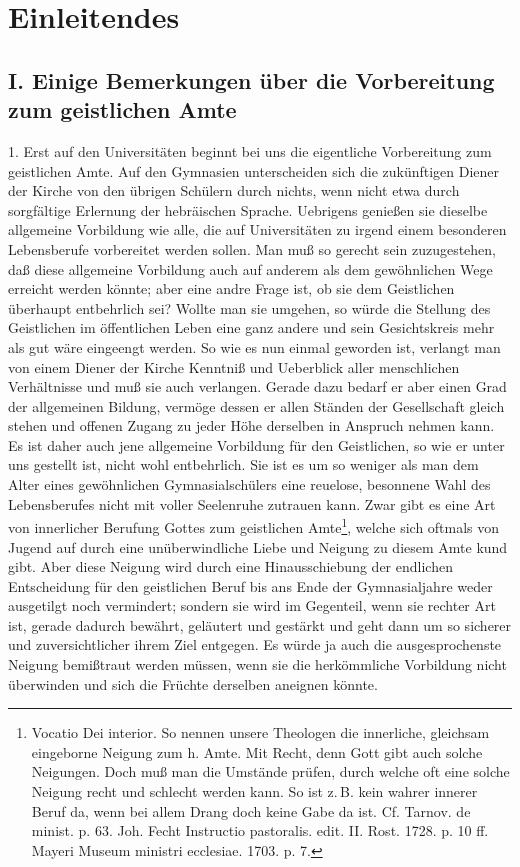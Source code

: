 
\chapter{Einleitendes}

\section[I. Vorbereitung zum geistlichen Amte]{I. Einige Bemerkungen über die Vorbereitung zum geistlichen Amte}

1. Erst auf den Universitäten beginnt bei uns die eigentliche Vorbereitung zum geistlichen Amte. Auf den Gymnasien unterscheiden sich die zukünftigen Diener der Kirche von den übrigen Schülern durch nichts, wenn nicht etwa durch sorgfältige Erlernung der hebräischen Sprache. Uebrigens genießen sie dieselbe allgemeine Vorbildung wie alle, die auf Universitäten zu irgend einem besonderen Lebensberufe vorbereitet werden sollen. Man muß so gerecht sein zuzugestehen, daß diese allgemeine Vorbildung auch auf anderem als dem gewöhnlichen Wege erreicht werden könnte; aber eine andre Frage ist, ob sie dem Geistlichen überhaupt entbehrlich sei? Wollte man sie umgehen, so würde die Stellung des Geistlichen im öffentlichen Leben eine ganz andere und sein Gesichtskreis mehr als gut wäre eingeengt werden. So wie es nun einmal geworden ist, verlangt man von einem Diener der Kirche Kenntniß und Ueberblick aller menschlichen Verhältnisse und muß sie auch verlangen. Gerade dazu bedarf er aber einen Grad der allgemeinen Bildung, vermöge dessen er allen Ständen der Gesellschaft
gleich stehen und offenen Zugang zu jeder Höhe derselben in Anspruch nehmen kann. Es ist daher auch jene allgemeine Vorbildung für den Geistlichen, so wie er unter uns gestellt ist, nicht wohl entbehrlich. Sie ist es um so weniger als man dem Alter eines gewöhnlichen Gymnasialschülers eine reuelose, besonnene Wahl des Lebensberufes nicht mit voller Seelenruhe zutrauen kann. Zwar gibt es eine Art von innerlicher Berufung Gottes zum geistlichen Amte\footnote{Vocatio Dei interior. So nennen unsere Theologen die innerliche, gleichsam eingeborne Neigung zum h. Amte. Mit Recht, denn Gott gibt auch solche Neigungen. Doch muß man die Umstände prüfen, durch welche oft eine solche Neigung recht und schlecht werden kann. So ist z.\,B. kein wahrer innerer Beruf da, wenn bei allem Drang doch keine Gabe da ist. Cf. Tarnov. de minist. p. 63. Joh. Fecht Instructio pastoralis. edit. II. Rost. 1728. p. 10 ff. Mayeri Museum ministri ecclesiae. 1703. p. 7.}, welche sich oftmals von Jugend auf durch eine unüberwindliche Liebe und Neigung zu diesem Amte kund gibt. Aber diese Neigung wird durch eine Hinausschiebung der endlichen Entscheidung für den geistlichen Beruf bis ans Ende der Gymnasialjahre weder ausgetilgt noch vermindert; sondern sie wird im Gegenteil, wenn sie rechter Art ist, gerade dadurch bewährt, geläutert und gestärkt und geht dann um so sicherer und zuversichtlicher ihrem Ziel entgegen. Es würde ja auch die ausgesprochenste Neigung bemißtraut werden müssen, wenn sie die herkömmliche Vorbildung nicht überwinden und sich die Früchte derselben aneignen könnte.

